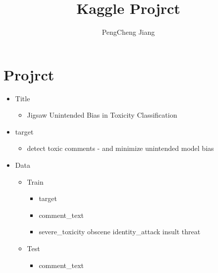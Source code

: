 \documentclass{amsart}
\begin{document}
%
%
\title[Learning Process]{Kaggle Projrct}%

\author{PengCheng Jiang}
\address[A.~1]{School of Computer Science,\\ 
JiLin University, jilin 130000, China}%


%
\date{\gitAuthorDate}%


\maketitle
\tableofcontents

\newpage

\section{Projrct}
    \begin{itemize}
        \item Title
            \begin{itemize}
                \item Jigsaw Unintended Bias in Toxicity Classification  
            \end{itemize}  
        \item target
            \begin{itemize}
                \item detect toxic comments - and minimize unintended model bias
            \end{itemize}
        \item Data
            \begin{itemize}
                \item Train
                    \begin{itemize}
                        \item target
                        \item comment_text
                        \item severe_toxicity obscene identity_attack insult threat
                    \end{itemize}
            \end{itemize}
            \begin{itemize}
                \item Test
                    \begin{itemize}
                        \item comment_text
                    \end{itemize}
            \end{itemize}
    \end{itemize}   
\end{document}
